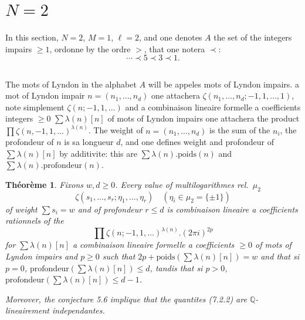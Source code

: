 \documentclass[11pt,a4paper]{article}
\theoremstyle{plain}
\newtheorem{theorem}{Th\'eor\`eme}[section]
\theoremstyle{definition}
\newcommand{\Q}{\mathbb{Q}}
\begin{document}
\section{$N=2$}
\label{sec:7}

In this section, $N=2$, $M=1$, $\ell=2$, and one denotes $A$ the set of the integers impairs $\geq 1$, ordonne by the ordre $>$, that one notera $\prec$:
\[
\cdots \prec 5 \prec 3 \prec 1.
\]

\subsection{}
The mots of Lyndon in the alphabet $A$ will be appeles mots of Lyndon impairs. a mot of Lyndon impair $n = (n_1,\ldots,n_d)$ one attachera $\zeta(n_1,\ldots,n_d; -1, 1,\ldots,1)$, note simplement $\zeta(n; -1, 1, \ldots)$ and a combinaison lineaire formelle a coefficients integers $\geq 0$ $\sum \lambda(n)[n]$ of mots of Lyndon impairs one attachera the product $\prod \zeta(n, -1, 1, \ldots)^{\lambda(n)}$. The weight of $n = (n_1,\ldots,n_d)$ is the sum of the $n_i$, the profondeur of $n$ is sa longueur $d$, and one defines weight and profondeur of $\sum \lambda(n)[n]$ by additivite: this are $\sum \lambda(n).\text{poids}(n)$ and $\sum \lambda(n).\text{profondeur}(n)$.

\begin{theorem}\label{thm:7.2}
Fixons $w, d \geq 0$. Every value of multilogarithmes rel.~$\mu_2$
\begin{equation}\label{eq:7.2.1}
\zeta(s_1,\ldots,s_r; \eta_1,\ldots, \eta_r) \quad (\eta_i \in \mu_2 = \{\pm 1\})
\end{equation}
of weight $\sum s_i = w$ and of profondeur $r \leq d$ is combinaison lineaire a coefficients rationnels of the
\begin{equation}\label{eq:7.2.2}
\prod \zeta(n; -1, 1, \ldots)^{\lambda(n)}.(2\pi i)^{2p}
\end{equation}
for $\sum \lambda(n)[n]$ a combinaison lineaire formelle a coefficients $\geq 0$ of mots of Lyndon impairs and $p \geq 0$ such that $2p + \text{poids}(\sum \lambda(n)[n]) = w$ and that si $p=0$, $\text{profondeur}(\sum \lambda(n)[n]) \leq d$, tandis that si $p > 0$, $\text{profondeur}(\sum \lambda(n)[n]) \leq d-1$.

Moreover, the conjecture 5.6 implique that the quantites (7.2.2) are $\Q$-lineairement independantes.
\end{theorem}
\end{document}
